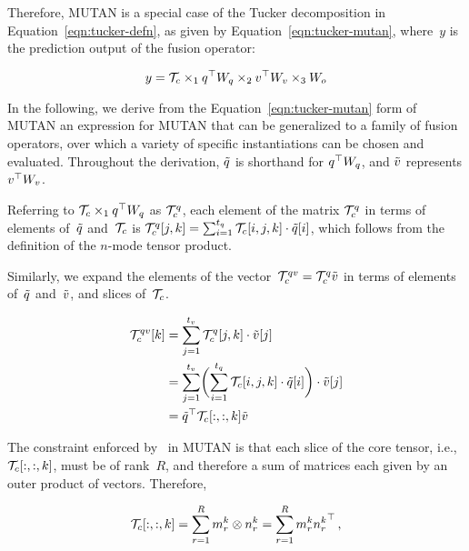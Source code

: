 Therefore, MUTAN is a special case of the Tucker decomposition in
Equation~\ref{eqn:tucker-defn}, as given by Equation~\ref{eqn:tucker-mutan},
where~$y$ is the prediction output of the fusion operator:

\begin{equation}
        y = \mathcal{T}_c \times_1
                q^\top{} W_{q}{} \times_2
                v^\top{} W_{v}{} \times_3
                W_o
        \label{eqn:tucker-mutan}
\end{equation}

In the following, we derive from the Equation~\ref{eqn:tucker-mutan} form of
MUTAN an expression for MUTAN that can be generalized to a family of fusion
operators, over which a variety of specific instantiations can be chosen and
evaluated.  Throughout the derivation, $\tilde{q}$ is shorthand for
$q^\top{} W_{q}{}$, and $\tilde{v}$ represents $v^\top{} W_{v}{}$.

Referring to $\mathcal{T}_c \times_1 q^\top{} W_{q}{}$ as $\mathcal{T}_c^{q}$, each element of
the matrix $\mathcal{T}_c^{q}$ in terms of elements of~$\tilde{q}$ and~$\mathcal{T}_c$ is
$\mathcal{T}_c^{q}[j, k] = \sum_{i = 1}^{t_q} \mathcal{T}_c[i, j, k] \cdot \tilde{q}[i]$,
which follows from the definition of the $n$-mode tensor product.

Similarly, we expand the elements of the
vector~$\mathcal{T}_c^{qv} = \mathcal{T}_c^{q} \tilde{v}$ in terms of elements
of~$\tilde{q}$ and~$\tilde{v}$, and slices of~$\mathcal{T}_c$.

\begin{align}
\begin{split}
        \mathcal{T}_c^{qv}[k] &= \sum_{j = 1}^{t_v} \mathcal{T}_c^{q}[j, k] \cdot \tilde{v}[j]  \\
                       &= \sum_{j = 1}^{t_v} \biggl(\sum_{i = 1}^{t_q} \mathcal{T}_c[i, j, k] \cdot \tilde{q}[i]\biggr) \cdot \tilde{v}[j]  \\
                       &= {\tilde{q}}^\top \mathcal{T}_c[:, :, k] \tilde{v}
\end{split}
\label{eqn:tucker-core-tensor-expanded}
\end{align}

The constraint enforced by~\citet{ben2017mutan} in MUTAN is that each slice of
the core tensor, i.e.,~$\mathcal{T}_c[:, :, k]$, must be of rank~$R$, and therefore a sum
of matrices each given by an outer product of vectors. Therefore,

\begin{equation}
        \mathcal{T}_c[:, :, k] = \sum_{r = 1}^R m_r^k \otimes n_r^k
                      = \sum_{r = 1}^R m_r^k {n_r^k}^\top \,,
\label{eqn:tucker-core-tensor-rank-r}
\end{equation}

